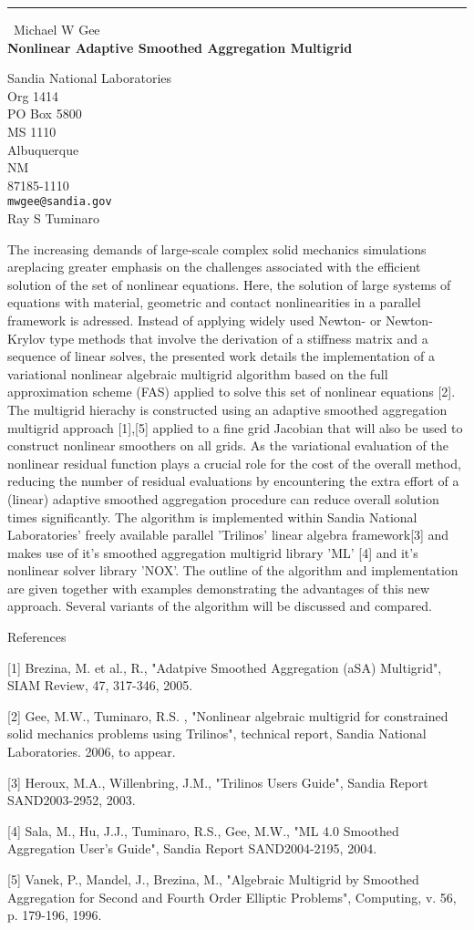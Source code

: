 \documentclass{report}
\begin{document}
\begin{center}
\rule{6in}{1pt} \
{\large Michael W Gee \\
{\bf Nonlinear Adaptive Smoothed Aggregation Multigrid}}

Sandia National Laboratories \\ Org 1414 \\ PO Box 5800 \\ MS 1110 \\ Albuquerque \\ NM \\ 87185-1110
\\
{\tt mwgee@sandia.gov}\\
Ray S Tuminaro\end{center}

The increasing demands of large-scale complex solid mechanics simulations
areplacing greater emphasis on the challenges associated with the
efficient solution of the set of nonlinear equations. Here, the solution
of large systems of equations with material, geometric and contact
nonlinearities in a parallel
framework is adressed. Instead of applying widely used Newton- or
Newton-Krylov type methods that involve the derivation of a stiffness
matrix and a sequence of linear solves, the presented work details the
implementation of a variational nonlinear algebraic multigrid algorithm
based on the full approximation scheme (FAS) applied to solve this set of
nonlinear equations [2]. The multigrid hierachy is constructed using an
adaptive smoothed aggregation multigrid approach [1],[5] applied to a
fine grid Jacobian that will also be used to construct nonlinear
smoothers on all grids. As the variational evaluation of the
nonlinear residual function plays a crucial role for the cost of the
overall method, reducing the number of residual evaluations by
encountering the extra effort of a (linear) adaptive smoothed aggregation
procedure can reduce overall solution times significantly. The algorithm
is implemented within Sandia National Laboratories' freely available
parallel 'Trilinos' linear algebra framework[3] and makes use of it's
smoothed aggregation multigrid library 'ML' [4] and it's nonlinear solver
library 'NOX'.
The outline of the algorithm and implementation are given together with
examples demonstrating the advantages of this new approach. Several
variants of the algorithm will be discussed and compared.


References

[1] Brezina, M. et al., R., "Adatpive Smoothed Aggregation (aSA)
Multigrid", SIAM Review, 47, 317-346, 2005.

[2] Gee, M.W., Tuminaro, R.S. , "Nonlinear algebraic multigrid for
constrained solid mechanics problems using Trilinos", technical report,
Sandia National Laboratories. 2006, to appear.

[3] Heroux, M.A., Willenbring, J.M., "Trilinos Users Guide", Sandia
Report SAND2003-2952, 2003.

[4] Sala, M., Hu, J.J., Tuminaro, R.S., Gee, M.W., "ML 4.0 Smoothed
Aggregation User's Guide", Sandia Report SAND2004-2195, 2004.

[5] Vanek, P., Mandel, J., Brezina, M., "Algebraic Multigrid by Smoothed
Aggregation for Second and Fourth Order Elliptic Problems", Computing, v.
56, p. 179-196, 1996.
\end{document}
